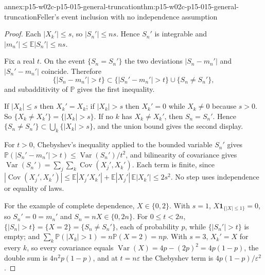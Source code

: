 \begin{annexitem}{annex:p15-w02c-p15-015-general-truncation}{thm:p15-w02c-p15-015-general-truncation}{Feller's event inclusion with no independence assumption}
\begin{proof}
Each \(|X_k'|\leq s\), so \(|S_n'|\leq ns\). Hence \(S_n'\) is
integrable and \(|m_n'|\leq\mathbb E|S_n'|\leq ns\).

Fix a real \(t\). On the event \(\{S_n=S_n'\}\) the two deviations
\(|S_n-m_n'|\) and \(|S_n'-m_n'|\) coincide. Therefore
\[
 \{|S_n-m_n'|>t\}\subset\{|S_n'-m_n'|>t\}\cup\{S_n\ne S_n'\},
\]
and subadditivity of \(\mathbb P\) gives the first inequality.

If \(|X_k|\leq s\) then \(X_k'=X_k\); if \(|X_k|>s\) then \(X_k'=0\)
while \(X_k\ne0\) because \(s>0\). So \(\{X_k\ne X_k'\}=\{|X_k|>s\}\).
If no \(k\) has \(X_k\ne X_k'\), then \(S_n=S_n'\). Hence
\(\{S_n\ne S_n'\}\subset\bigcup_k\{|X_k|>s\}\), and the union bound
gives the second display.

For \(t>0\), Chebyshev's inequality applied to the bounded variable
\(S_n'\) gives
\(\mathbb P(|S_n'-m_n'|>t)\leq\operatorname{Var}(S_n')/t^2\), and
bilinearity of covariance gives
\(\operatorname{Var}(S_n')=\sum_j\sum_k\operatorname{Cov}(X_j',X_k')\).
Each term is finite, since
\(|\operatorname{Cov}(X_j',X_k')|\leq
\mathbb E|X_j'X_k'|+\mathbb E|X_j'|\,\mathbb E|X_k'|\leq2s^2\).
No step uses independence or equality of laws.

For the example of complete dependence, \(X\in\{0,2\}\). With
\(s=1\), \(X\mathbf1_{\{|X|\leq1\}}=0\), so \(S_n'=0=m_n'\) and
\(S_n=nX\in\{0,2n\}\). For \(0\leq t<2n\),
\(\{|S_n|>t\}=\{X=2\}=\{S_n\ne S_n'\}\), each of probability \(p\),
while \(\{|S_n'|>t\}\) is empty; and
\(\sum_k\mathbb P(|X_k|>1)=n\mathbb P(X=2)=np\). With \(s=3\),
\(X_k'=X\) for every \(k\), so every covariance equals
\(\operatorname{Var}(X)=4p-(2p)^2=4p(1-p)\), the double sum is
\(4n^2p(1-p)\), and at \(t=n\varepsilon\) the Chebyshev term is
\(4p(1-p)/\varepsilon^2\).
\end{proof}
\end{annexitem}

